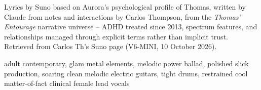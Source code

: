 
\label{sec:explicit-agreements}
\begin{notes}
Lyrics by Suno based on Aurora's psychological profile of Thomas, written by Claude from notes and interactions by Carlos Thompson, from the \emph{Thomas' Entourage} narrative universe -- ADHD treated since 2013, spectrum features, and relationships managed through explicit terms rather than implicit trust. Retrieved from Carlos Th's Suno page (V6-MINI, 10 October 2026).
\end{notes}
\begin{style}
adult contemporary, glam metal elements, melodic power ballad, polished slick production, soaring clean melodic electric guitars, tight drums, restrained cool matter-of-fact clinical female lead vocals
\end{style}
